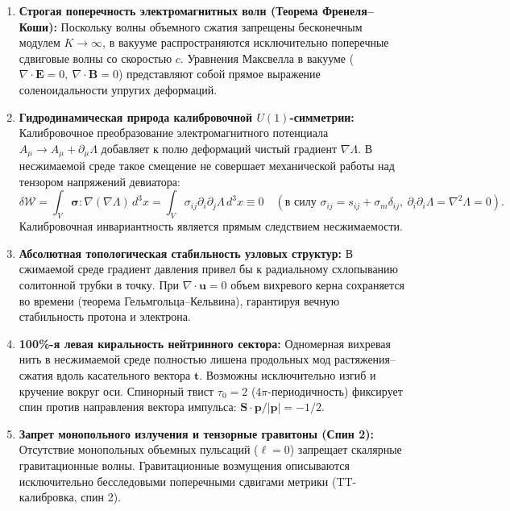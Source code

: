 \documentclass[12pt,a4paper]{article}
\begin{document}
	\begin{enumerate}
		\item \textbf{Строгая поперечность электромагнитных волн (Теорема Френеля--Коши):}
		Поскольку волны объемного сжатия запрещены бесконечным модулем $K \to \infty$, в вакууме распространяются исключительно поперечные сдвиговые волны со скоростью $c$. Уравнения Максвелла в вакууме ($\nabla \cdot \mathbf{E} = 0, \ \nabla \cdot \mathbf{B} = 0$) представляют собой прямое выражение соленоидальности упругих деформаций.
		
		\item \textbf{Гидродинамическая природа калибровочной $U(1)$-симметрии:}
		Калибровочное преобразование электромагнитного потенциала $A_\mu \to A_\mu + \partial_\mu \Lambda$ добавляет к полю деформаций чистый градиент $\nabla \Lambda$. В несжимаемой среде такое смещение не совершает механической работы над тензором напряжений девиатора:
		\begin{equation}
			\delta \mathcal{W} = \int_V \boldsymbol{\sigma} : \nabla(\nabla \Lambda) \, d^3x = \int_V \sigma_{ij} \partial_i \partial_j \Lambda \, d^3x \equiv 0 \quad (\text{в силу } \sigma_{ij} = s_{ij} + \sigma_m \delta_{ij}, \ \partial_i \partial_i \Lambda = \nabla^2 \Lambda = 0).
		\end{equation}
		Калибровочная инвариантность является прямым следствием несжимаемости.
		
		\item \textbf{Абсолютная топологическая стабильность узловых структур:}
		В сжимаемой среде градиент давления привел бы к радиальному схлопыванию солитонной трубки в точку. При $\nabla \cdot \mathbf{u} = 0$ объем вихревого керна сохраняется во времени (теорема Гельмгольца--Кельвина), гарантируя вечную стабильность протона и электрона.
		
		\item \textbf{100\%-я левая киральность нейтринного сектора:}
		Одномерная вихревая нить в несжимаемой среде полностью лишена продольных мод растяжения--сжатия вдоль касательного вектора $\mathbf{t}$. Возможны исключительно изгиб и кручение вокруг оси. Спинорный твист $\tau_0 = 2$ ($4\pi$-периодичность) фиксирует спин против направления вектора импульса: $\mathbf{S} \cdot \mathbf{p} / |\mathbf{p}| = -1/2$.
		
		\item \textbf{Запрет монопольного излучения и тензорные гравитоны (Спин 2):}
		Отсутствие монопольных объемных пульсаций ($\ell = 0$) запрещает скалярные гравитационные волны. Гравитационные возмущения описываются исключительно бесследовыми поперечными сдвигами метрики (TT-калибровка, спин 2).
	\end{enumerate}
	
\end{document}
